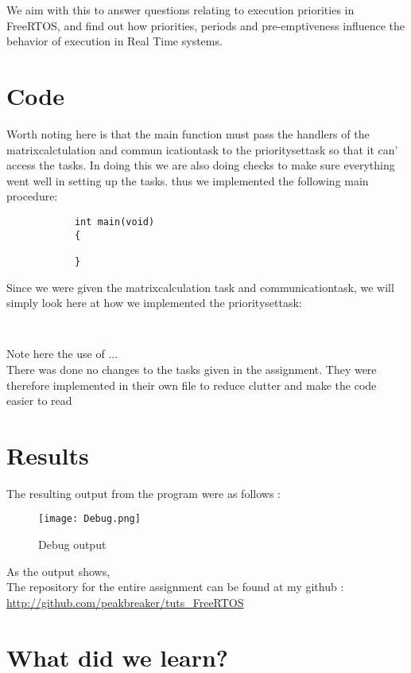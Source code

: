 \documentclass[12pt,fleqn,leqno,letterpaper]{article}
\begin{document}
    We aim with this to answer questions relating to execution priorities in FreeRTOS, 
    and find out how priorities, periods and pre-emptiveness influence the behavior of
    execution in Real Time systems.

    \section*{Code}

        Worth noting here is that the main function must pass the handlers of the 
        matrixcalctulation and commun
        icationtask to the prioritysettask so that it can'
        access the tasks.  In doing this we are also doing checks to make sure everything
        went well in setting up the tasks.  thus we implemented the following main procedure: \\

        \begin{verbatim}
            int main(void)
            {
                
            }
        \end{verbatim}

        Since we were given the matrixcalculation task and communicationtask, we will simply
        look here at how we implemented the prioritysettask:

        \begin{verbatim}
            
        \end{verbatim}

        Note here the use of ... \\

        There was done no changes to the tasks given in the assignment. 
        They were therefore implemented in their own file to reduce clutter and make the code easier to read
    
    \newpage
    \section*{Results}

        The resulting output from the program were as follows : \\

        \begin{figure}[h]
            \centering
            \texttt{[image: Debug.png]}
            \caption{Debug output}
            \label{figure:debug}
        \end{figure}

        As the output shows, \\
        
        The repository for the entire assignment can be found at my github : \\
        
        \url{http://github.com/peakbreaker/tuts\_FreeRTOS}

        \section*{What did we learn?}

    
\end{document}
